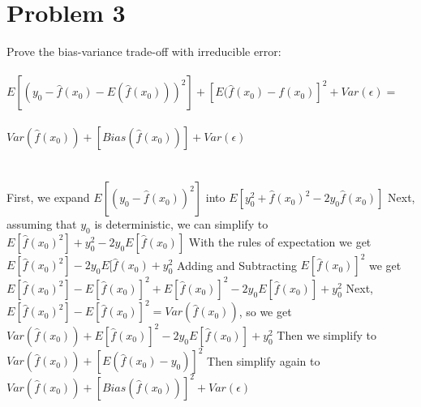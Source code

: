 \documentclass[11pt,a4paper,twoside,openright]{report}
\begin{document}
	
	
	
	\section*{Problem 3}
	
	Prove the bias-variance trade-off with irreducible error:\\\\
	
	
	
	$E[(y_{0} - \hat{f}(x_{0}) - E(\hat{f}(x_{0})))^2] + [E(\hat{f}(x_{0}) - f(x_{0})]^2 + Var(\epsilon) =$\\\\
	
	$Var(\hat{f}(x_{0})) + [Bias(\hat{f}(x_{0}))] + Var(\epsilon)$\\
	\\\\
	
	First, we expand $E[(y_{0} - \hat{f}(x_{0}))^2]$ into $E[y_{0}^2 + \hat{f}(x_{0})^2 - 2y_{0}\hat{f}(x_{0})]$\newline
    	\newline
  	Next, assuming that $y_{0}$ is deterministic, we can simplify to $E[\hat{f}(x_{0})^2] + y_{0}^2 - 2y_{0}E[\hat{f}(x_{0})]$\newline
    	\newline
    	With the rules of expectation we get $E[\hat{f}(x_{0})^2] - 2y_{0}E[\hat{f}(x_{0}) + y_{0}^2$\newline
    	\newline
    	Adding and Subtracting $E[\hat{f}(x_{0})]^2$ we get
	$E[\hat{f}(x_{0})^2] - E[\hat{f}(x_{0})]^2 + E[\hat{f}(x_{0})]^2  - 2y_{0}E[\hat{f}(x_{0})] + y_{0}^2$\newline
    	\newline
   	Next, $E[\hat{f}(x_{0})^2] - E[\hat{f}(x_{0})]^2 = Var(\hat{f}(x_{0}))$, so we get\newline 
    	\newline
    	$Var(\hat{f}(x_{0})) + E[\hat{f}(x_{0})]^2  - 2y_{0}E[\hat{f}(x_{0})] + y_{0}^2$\newline
    	\newline
    	Then we simplify to $Var(\hat{f}(x_{0})) + [E(\hat{f}(x_{0}) - y_{0})]^2$\newline
    	\newline
    	Then simplify again to $Var(\hat{f}(x_{0})) + [Bias(\hat{f}(x_{0}))]^2 + Var(\epsilon)$
	
	
	
\end{document}
